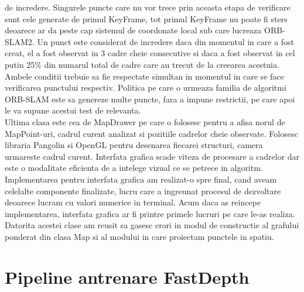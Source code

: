 \documentclass[12pt,a4paper]{report}
\begin{document}
de incredere. Singurele puncte care nu vor trece prin aceasta etapa de verificare sunt
cele generate de primul KeyFrame, tot primul KeyFrame nu poate fi sters deoarece 
ar da peste cap sistemul de coordonate local sub care lucreaza ORB-SLAM2. Un punct 
este considerat de incredere daca din momentul in care a fost creat, el a fost 
observat in 3 cadre cheie consecutive si daca a fost observat in cel putin 25\% din 
numarul total de cadre care au trecut de la creearea acestuia. Ambele conditii 
trebuie sa fie respectate simultan in momentul in care se face verificarea punctului
respectiv. Politica pe care o urmeaza familia de algoritmi ORB-SLAM este sa genereze 
multe puncte, fara a impune restrictii, pe care apoi le va supune acestui test de 
relevanta. \\

Ultima clasa este cea de MapDrawer pe care o folosesc pentru a afisa norul de MapPoint-uri,
cadrul curent analizat si pozitiile cadrelor cheie observate. Folosesc libraria Pangolin si 
OpenGL pentru desenarea fiecarei structuri, camera urmareste cadrul curent. Interfata grafica 
scade viteza de procesare a cadrelor dar este o modalitate eficienta de a intelege vizual ce 
se petrece in algoritm. Implementarea pentru interfata grafica am realizat-o spre final, cand 
aveam celelalte componente finalizate, lucru care a ingreunat procesul de dezvoltare deoarece 
lucram cu valori numerice in terminal. Acum daca as reincepe implementarea, interfata grafica ar fi
printre primele lucruri pe care le-as realiza. Datorita acestei clase am reusit sa gasesc erori in
modul de constructie al grafului ponderat din clasa Map si al modului in care proiectam punctele 
in spatiu.

\section{Pipeline antrenare FastDepth}
\end{document}
